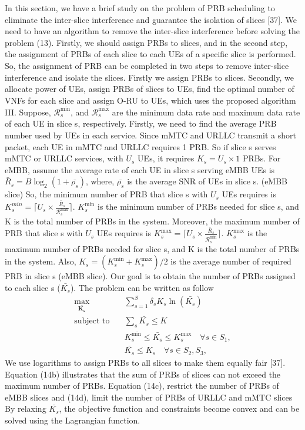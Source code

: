 \documentclass[12pt, letterpaper]{article}
\begin{document}
{ In this section, we have a brief study on the problem of PRB scheduling to eliminate  the inter-slice interference and guarantee the isolation of slices [37].
We need to have an algorithm to remove the inter-slice interference before solving the problem (13). Firstly, we should assign PRBs to slices, and in the second step, the assignment of PRBs of each slice to each UEs of a specific slice is performed. So, the assignment of PRB can be completed in two steps to remove inter-slice interference and isolate the slices. Firstly we assign PRBs to slices. Secondly, we allocate power of UEs, assign PRBs of slices to UEs, find the optimal number of VNFs for each slice and assign O-RU to UEs, which uses the proposed algorithm III.
Suppose, $\mathcal{R}_{{s}}^{\min}$, and $\mathcal{R}_{{s}}^{\max}$ are the minimum data rate and maximum data rate of each UE in slice s, respectively.
Firstly, we need to find the average PRB number used by UEs in each service. Since mMTC and URLLC transmit a short packet, each UE in mMTC and URLLC requires 1 PRB. So if slice s serves mMTC or URLLC services, with $U_s$ UEs, it requires $K_s = U_s \times 1$ PRBs. For eMBB, assume the average rate of each UE in slice s serving eMBB UEs is $\bar{R}_s = B\log_2(1 + \bar{\rho_s})$, where, $\bar{\rho_s}$ is the average SNR of UEs in slice s. (eMBB slice)
So, the minimum number of PRB that slice s with $U_s$ UEs requires is $K_s^{min} = \lceil{U_s \times \frac{\bar{R}_s}{\mathcal{R}_{{s}}^{\max}}}\rceil$. $K_s^{\min} $ is the minimum number of PRBs needed for slice s, and K is the total number of PRBs in the system.  
Moreover, the maximum number of PRB that slice s with $U_s$ UEs requires is $K_s^{\max} = \lceil{U_s \times \frac{\bar{R}_s}{\mathcal{R}_{{s}}^{\min}}}\rceil$. $K_s^{\max} $ is the maximum number of PRBs needed for slice s, and K is the total number of PRBs in the system. Also, $K_s = (K_s^{\min}+K_s^{\max})/2$ is the average number of required PRB in slice s (eMBB slice).
Our goal is to obtain the number of PRBs assigned to each slice s ($\bar{K_s}$).
The problem can be written as follow
\begin{subequations}\label{prob:prb}
\begin{alignat}{4}
\max\limits_{\boldsymbol{\bar{K_s}}} \quad &  \sum_{s=1}^{S}\delta_s K_s \ln(\bar{K_s}) \ \\
\text{subject to} \quad  & \sum_s{\bar{K_s}} \leq K
 \label{prb0} \\
& K_s^{\min} \leq \bar{K_s}  \leq K_s^{\max}  \quad \forall s \in S_1,\label{prb1} \\
&  \bar{K_s} \leq K_s  \quad \forall s \in S_2, S_3,\label{prb2}
\end{alignat}
\label{constraints}
\end{subequations}
We use logarithms to assign PRBs to all slices to make
them equally fair [37]. Equation (14b) illustrates that the
sum of PRBs of slices can not exceed the maximum number
of PRBs. Equation (14c), restrict the number of PRBs
of eMBB slices and (14d), limit the number of PRBs of
URLLC and mMTC slices By relaxing $\bar{K_s}$, the objective function and constraints become convex and can be solved using the Lagrangian function.

}
\end{document}
